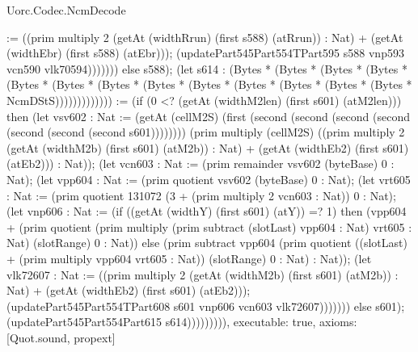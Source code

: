 \begin{lexlean}{Uorc.Codec.NcmDecode}
\begin{semanticmodule}
{:= ((prim multiply 2 (getAt (widthRrun) (first s588) (atRrun)) : Nat) + (getAt (widthEbr) (first s588) (atEbr))); (updatePart545Part554TPart595 s588 vnp593 vcn590 vlk70594))))))) else s588); (let s614 : (Bytes * (Bytes * (Bytes * (Bytes * (Bytes * (Bytes * (Bytes * (Bytes * (Bytes * (Bytes * (Bytes * (Bytes * (Bytes * NcmDStS))))))))))))) := (if (0 <? (getAt (widthM2len) (first s601) (atM2len))) then (let vsv602 : Nat := (getAt (cellM2S) (first (second (second (second (second (second (second (second s601)))))))) (prim multiply (cellM2S) ((prim multiply 2 (getAt (widthM2b) (first s601) (atM2b)) : Nat) + (getAt (widthEb2) (first s601) (atEb2))) : Nat)); (let vcn603 : Nat := (prim remainder vsv602 (byteBase) 0 : Nat); (let vpp604 : Nat := (prim quotient vsv602 (byteBase) 0 : Nat); (let vrt605 : Nat := (prim quotient 131072 (3 + (prim multiply 2 vcn603 : Nat)) 0 : Nat); (let vnp606 : Nat := (if ((getAt (widthY) (first s601) (atY)) =? 1) then (vpp604 + (prim quotient (prim multiply (prim subtract (slotLast) vpp604 : Nat) vrt605 : Nat) (slotRange) 0 : Nat)) else (prim subtract vpp604 (prim quotient ((slotLast) + (prim multiply vpp604 vrt605 : Nat)) (slotRange) 0 : Nat) : Nat)); (let vlk72607 : Nat := ((prim multiply 2 (getAt (widthM2b) (first s601) (atM2b)) : Nat) + (getAt (widthEb2) (first s601) (atEb2))); (updatePart545Part554TPart608 s601 vnp606 vcn603 vlk72607))))))) else s601); (updatePart545Part554Part615 s614))))))))),
  executable: true,
  axioms: [Quot.sound, propext]
}


\end{semanticmodule}
\end{lexlean}
